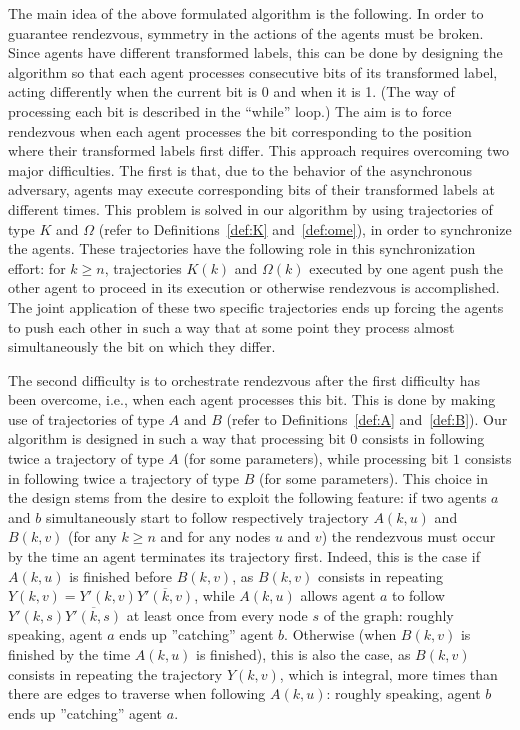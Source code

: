 \documentclass [11pt] {article}
\begin{document}
{The main idea of the above formulated algorithm is the following. In order to guarantee rendezvous, symmetry in the actions of the agents must be broken.
 Since agents have different transformed labels, this can be done by designing the algorithm so that each agent processes consecutive bits of its transformed label, acting differently when the current bit is 0 and when it is 1.  (The way of processing each bit is described in the ``while'' loop.) The aim is to force rendezvous when each agent processes the bit corresponding to the position where their transformed labels {first} differ. This approach requires overcoming two major difficulties. The first is that, due to the behavior of the asynchronous adversary,
 agents may execute corresponding bits of their transformed labels at different times. This problem is solved in our algorithm by using trajectories of type $K$ and $\Omega$ (refer to Definitions~\ref{def:K} and~\ref{def:ome}), in order to synchronize the agents. These trajectories have the following role in this synchronization effort: for $k\geq n$, trajectories $K(k)$ and $\Omega(k)$ executed by one agent push the other agent to proceed in its execution or otherwise rendezvous is accomplished. The joint application of these two specific trajectories {ends up forcing} the agents to push each other in such a way that at some point they process almost simultaneously the bit on which they differ.}

{ The second difficulty is to orchestrate rendezvous after the first difficulty has been overcome, i.e., when each agent 
 processes this bit. This is done by making use of trajectories of type $A$ and $B$ (refer to Definitions~\ref{def:A} and~\ref{def:B}). Our algorithm is designed in such a way that processing bit $0$ consists in following twice a trajectory of type $A$ (for some parameters), while processing bit $1$ consists in following twice a trajectory of type $B$ (for some parameters). This choice in the design stems from the desire to exploit the following feature: if two agents $a$ and $b$ simultaneously start to follow respectively trajectory $A(k,u)$ and $B(k,v)$ (for any $k\geq n$ and for any nodes $u$ and $v$) the rendezvous must occur by the time an agent terminates its trajectory first. Indeed, this is the case if $A(k,u)$ is finished before $B(k,v)$, as $B(k,v)$ consists in repeating $Y(k,v)= Y'(k,v)\overline{Y'(k,v)}$, while $A(k,u)$ allows agent $a$ to follow $Y'(k,s)\overline{Y'(k,s)}$ at least once from every node $s$ of the graph: roughly speaking, agent $a$ ends up ''catching'' agent $b$.
Otherwise (when $B(k,v)$ is finished by the time $A(k,u)$ is finished), this is also the case, as $B(k,v)$ consists in repeating the trajectory $Y(k,v)$, which is integral, more times than there are edges to traverse when following $A(k,u)$: roughly speaking, agent $b$ ends up ''catching'' agent $a$.}
\end{document}

